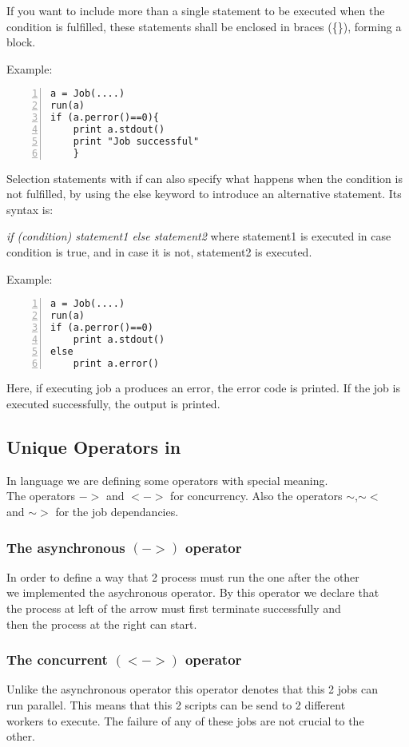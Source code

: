 If you want to include more than a single statement to be executed when the condition is fulfilled, these statements shall be enclosed in braces (\{\}), forming a block.

Example:

\begin{Verbatim}[numbers=left]
a = Job(....)
run(a)
if (a.perror()==0){
    print a.stdout()
    print "Job successful"
    }
\end{Verbatim}
Selection statements with if can also specify what happens when the condition is not fulfilled, by using the else keyword to introduce an alternative statement. Its syntax is:

\textit{if (condition) statement1 else statement2}
where statement1 is executed in case condition is true, and in case it is not, statement2 is executed.

Example:
\begin{Verbatim}[numbers=left]
a = Job(....)
run(a)
if (a.perror()==0)
    print a.stdout()
else
    print a.error()
\end{Verbatim}

Here, if executing job a produces an error, the error code is printed. If the job is executed successfully, the output is printed.



\subsection*{Unique Operators in \lang{}}

In \lang{} language we are defining some operators with special meaning.\\
The operators $->$ and $<->$ for concurrency. Also the operators $\sim$,$\sim<$\\and $\sim>$ for the job dependancies.\\
\subsubsection*{The asynchronous $(->)$ operator}
In order to define a way that 2 process must run the one after the other\\
we implemented the asychronous operator. By this operator we declare that\\
the process at left of the arrow must first terminate successfully and\\
then the process at the right can start.
\subsubsection*{The concurrent $(<->)$ operator}
Unlike the asynchronous operator this operator denotes that this 2 jobs can\\
run parallel. This means that this 2 scripts can be send to 2 different\\
workers to execute. The failure of any of these jobs are not crucial to the\\
other.
